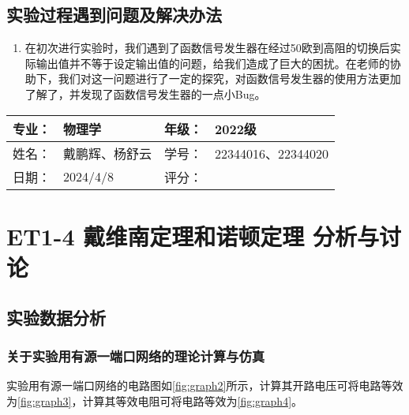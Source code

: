 \documentclass[dvipsnames, svgnames,a4paper,11pt]{article}
\begin{document}
	
	
	\subsection{实验过程遇到问题及解决办法}
	\begin{enumerate}
		\item 在初次进行实验时，我们遇到了函数信号发生器在经过50欧到高阻的切换后实际输出值并不等于设定输出值的问题，给我们造成了巨大的困扰。在老师的协助下，我们对这一问题进行了一定的探究，对函数信号发生器的使用方法更加了解了，并发现了函数信号发生器的一点小Bug。
	\end{enumerate}
	
	
	
	\clearpage
	
	\begin{table}
		\renewcommand\arraystretch{1.7}
		\begin{tabularx}{\textwidth}{|X|X|X|X|}
			\hline
			专业：& 物理学 &年级：& 2022级\\
			\hline
			姓名： & 戴鹏辉、杨舒云 & 学号：& 22344016、22344020\\
			\hline
			日期：& 2024/4/8 & 评分： &\\
			\hline
		\end{tabularx}
	\end{table}
	
	\section{ET1-4 戴维南定理和诺顿定理 \quad\heiti 分析与讨论}
	
	\subsection{实验数据分析}
	
	\subsubsection{关于实验用有源一端口网络的理论计算与仿真}
	
	实验用有源一端口网络的电路图如\cref{fig:graph2}所示，计算其开路电压可将电路等效为\cref{fig:graph3}，计算其等效电阻可将电路等效为\cref{fig:graph4}。

\end{document}

